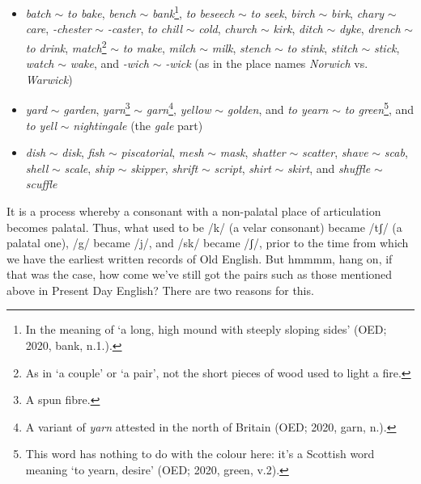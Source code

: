 \begin{itemize}
\item \textit{batch} $\sim$ \textit{to bake}, \textit{bench} $\sim$ \textit{bank}\footnote{In the meaning of `a long, high mound with steeply sloping sides' (OED; 2020,  bank, n.1.).}, \textit{to beseech} $\sim$ \textit{to seek}, \textit{birch} $\sim$ \textit{birk}, \textit{chary} $\sim$ \textit{care}, \textit{-chester} $\sim$ \textit{-caster}, \textit{to chill} $\sim$ \textit{cold}, \textit{church} $\sim$ \textit{kirk}, \textit{ditch} $\sim$ \textit{dyke}, \textit{drench} $\sim$ \textit{to drink}, \textit{match}\footnote{As in `a couple' or `a pair', not the short pieces of wood used to light a fire.} $\sim$ \textit{to make}, \textit{milch} $\sim$ \textit{milk}, \textit{stench} $\sim$ \textit{to stink}, \textit{stitch} $\sim$ \textit{stick}, \textit{watch} $\sim$ \textit{wake}, and \textit{-wich} $\sim$ \textit{-wick} (as in the place names \textit{Norwich} vs. \textit{Warwick})
\item \textit{yard} $\sim$ \textit{garden}, \textit{yarn}\footnote{A spun fibre.} $\sim$ \textit{garn}\footnote{A variant of \textit{yarn} attested in the north of Britain (OED; 2020,  garn, n.).}, \textit{yellow} $\sim$ \textit{golden}, and \textit{to yearn} $\sim$ \textit{to green}\footnote{This word has nothing to do with the colour here: it's a Scottish word meaning `to yearn, desire' (OED; 2020,  green, v.2).}, and \textit{to yell} $\sim$ \textit{nightingale} (the \textit{gale} part)
\item \textit{dish} $\sim$ \textit{disk}, \textit{fish} $\sim$ \textit{piscatorial}, \textit{mesh} $\sim$ \textit{mask}, \textit{shatter} $\sim$ \textit{scatter}, \textit{shave} $\sim$ \textit{scab}, \textit{shell} $\sim$ \textit{scale}, \textit{ship} $\sim$ \textit{skipper}, \textit{shrift} $\sim$ \textit{script}, \textit{shirt} $\sim$ \textit{skirt}, and \textit{shuffle} $\sim$ \textit{scuffle}
\end{itemize}

\noindent It is a process whereby a consonant with a non-palatal place of articulation becomes palatal. Thus, what used to be /k/ (a velar consonant) became /tʃ/ (a palatal one), /g/ became /j/, and /sk/ became /ʃ/, prior to the time from which we have the earliest written records of Old English. But hmmmm, hang on, if that was the case, how come we've still got the pairs such as those mentioned above in Present Day English? There are two reasons for this. 

